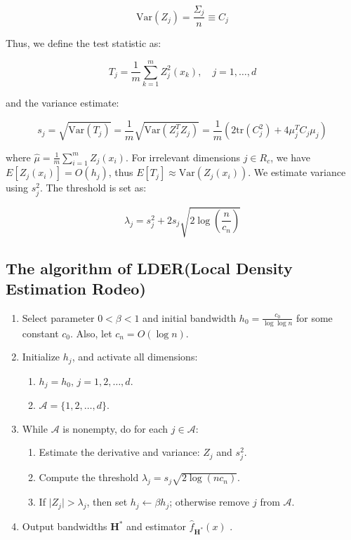 \documentclass{article}
\begin{document}
$$
\text{Var}(Z_j) = \frac{\Sigma_j}{n} \equiv C_j
$$

Thus, we define the test statistic as:

$$
T_j = \frac{1}{m} \sum_{k=1}^{m} Z^2_j(x_k), \quad j = 1, \ldots, d
$$

and the variance estimate:

$$
s_j = \sqrt{\text{Var}(T_j)} = \frac{1}{m} \sqrt{\text{Var}(Z^T_j Z_j)} = \frac{1}{m} \left(2 \text{tr}(C_j^2) + 4 \mu^T_j C_j \mu_j\right)
$$

where $\hat{\mu} = \frac{1}{m} \sum_{i=1}^{m} Z_j(x_i)$. For irrelevant dimensions $j \in R_c$, we have $E[Z_j(x_i)] = O(h_j)$, thus $E[T_j] \approx \text{Var}(Z_j(x_i))$. We estimate variance using $s^2_j$. The threshold is set as:

$$
\lambda_j = s^2_j + 2 s_j \sqrt{2 \log\left(\frac{n}{c_n}\right)}
$$



\subsection{The algorithm of LDER(Local Density Estimation Rodeo)}

\begin{enumerate}
    \item Select parameter $0 < \beta < 1$ and initial bandwidth $h_0 = \frac{c_0}{\log \log n}$ for some constant $c_0$. Also, let $c_n = O(\log n)$.
    \item Initialize $h_j$, and activate all dimensions:
    \begin{enumerate}
        \item $h_j = h_0, \, j = 1, 2, \ldots, d.$
        \item $\mathcal{A} = \{1, 2, \ldots, d\}.$
    \end{enumerate}
    \item While $\mathcal{A}$ is nonempty, do for each $j \in \mathcal{A}$:
    \begin{enumerate}
        \item Estimate the derivative and variance: $Z_j$ and $s_j^2$.
        \item Compute the threshold $\lambda_j = s_j \sqrt{2 \log (nc_n)}.$
        \item If $\lvert Z_j \rvert > \lambda_j$, then set $h_j \leftarrow \beta h_j$; otherwise remove $j$ from $\mathcal{A}$.
    \end{enumerate}
    \item Output bandwidths $\mathbf{H}^*$ and estimator $\hat{f}_{\mathbf{H}^*}(x)$ .
\end{enumerate}
\end{document}
